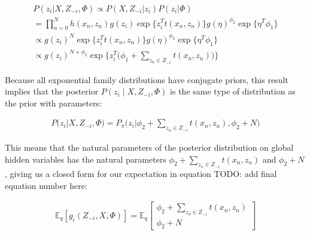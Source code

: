 \begin{align}
\nonumber P(z_i | X, Z_{-i}, \Phi) \propto P(X,Z_{-i} | z_i)P(z_i|\Phi) \\
\nonumber = \prod\limits_{n=0}^N  h(x_n, z_n) g(z_i)\exp\big\{z_i^T t(x_n, z_n)\big\}  g(\eta)^{\phi_2}\exp\big\{\eta^T\phi_1 \big\} \\
\nonumber \propto g(z_i)^N \exp\big\{z_i^T t(x_n, z_n)\big\}  g(\eta)^{\phi_2}\exp\big\{\eta^T\phi_1 \big\} \\
\propto g(z_i)^{N+\phi_2} \exp\bigg\{z_i^T \big(\phi_1 + \sum\limits_{z_n \in Z_{-i}} t(x_n, z_n)\big)\bigg\}
\end{align}

Because all exponential family distributions have conjugate priors, this result implies that the posterior $P(z_i \mid X, Z_{-i}, \Phi)$ is the same type of distribution as the prior with parameters:

\begin{align}
P(z_i | X,Z_{-i},\Phi) = P_{\pi}\big(z_i | \phi_2 + \sum\limits_{z_n \in Z_{-i}} t(x_n, z_n), \phi_2 + N\big)
\end{align}

This means that the natural parameters of the posterior distribution on global hidden variables has the natural parameters $\phi_2 + \sum\limits_{z_n \in Z_{-i}} t(x_n, z_n)$ and $\phi_2 + N$, giving us a closed form for our expectation in equation TODO: add final equation number here: 

\begin{align}
\mathbb{E}_q[g_i(Z_{-i}, X, \Phi)] = \mathbb{E}_q \begin{bmatrix} \phi_2 + \sum\limits_{z_n \in Z_{-i}} t(x_n, z_n) \\ \phi_2 + N \end{bmatrix}
\end{align}

\citep{hoffman:2013}






